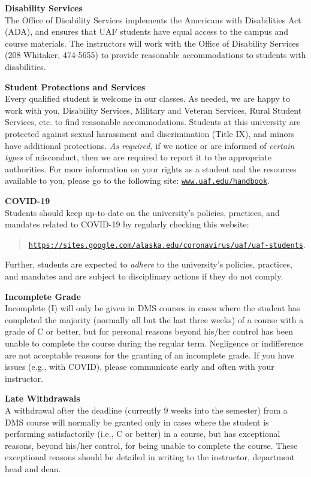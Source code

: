 \documentclass[12pt]{article}
\renewcommand{\emph}[1]{\textsf{\textbf{#1}}}
\newcommand{\localhead}[1]{\par\smallskip\textbf{#1}\nobreak\\}%
\def\subheading#1{\localhead{\emph{#1}}}
\begin{document}
\subheading{Disability Services}
The Office of Disability Services implements the
Americans with Disabilities Act (ADA), and ensures that UAF students
have equal access to the campus and course materials. The instructors will work with
the Office of Disability Services (208 Whitaker, 474-5655) to provide
reasonable accommodations to students with disabilities.

\subheading{Student Protections and Services}
Every qualified student is welcome in our classes.  As needed, we are happy to work with you, Disability Services, Military and Veteran Services, Rural Student Services, etc. to find reasonable accommodations. Students at this university are protected against sexual harassment and discrimination (Title IX), and minors have additional protections. \textit{As required,} if we notice or are informed of \textit{certain types} of misconduct, then we are required to report it to the appropriate authorities.  For more information on your rights as a student and the resources available to you, please go to the following site: \href{https://www.uaf.edu/handbook/}{\texttt{www.uaf.edu/handbook}}.

\subheading{COVID-19}
Students should keep up-to-date on the university's policies, practices, and mandates related to COVID-19 by regularly checking this website: 
\begin{quote}
\href{https://sites.google.com/alaska.edu/coronavirus/uaf/uaf-students}{\texttt{https://sites.google.com/alaska.edu/coronavirus/uaf/uaf-students}}.
\end{quote} Further, students are expected to {\it adhere} to the university's policies, practices, and mandates and are subject to disciplinary actions if they do not comply.

\subheading{Incomplete Grade} 
Incomplete (I) will only be given in DMS courses in cases where the student has completed the majority (normally all but the last three weeks) of a course with a grade of C or better, but for personal reasons beyond his/her control has been unable to complete the course during the regular term. Negligence or indifference are not acceptable reasons for the granting of an incomplete grade. If you have issues (e.g., with COVID), please communicate early and often with your instructor.

\subheading{Late Withdrawals} 
A withdrawal after the deadline (currently 9 weeks into the semester) from a DMS course will normally be granted only in cases where the student is performing satisfactorily (i.e., C or better) in a course, but has exceptional reasons, beyond his/her control, for being unable to complete the course. These exceptional reasons should be detailed in writing to the instructor, department head and dean.
\end{document}
